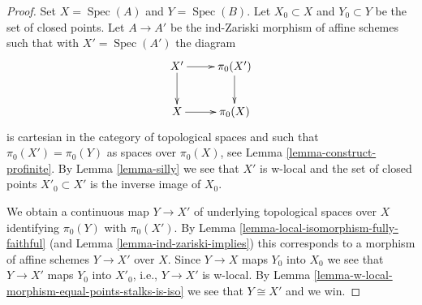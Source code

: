 \documentclass[10pt,a4paper]{amsart}
\theoremstyle{plain}
\theoremstyle{definition}
\theoremstyle{remark}
\numberwithin{equation}{subsection}
\def\Spec{\mathop{\mathrm{Spec}}}
\begin{document}
\begin{proof}
Set $X = \Spec(A)$ and $Y = \Spec(B)$. Let $X_0 \subset X$ and
$Y_0 \subset Y$ be the set of closed points. Let $A \to A'$ be the ind-Zariski
morphism of affine schemes such that with $X' = \Spec(A')$ the diagram
$$
\xymatrix{
X' \ar[r] \ar[d] & \pi_0(X') \ar[d] \\
X \ar[r] & \pi_0(X)
}
$$
is cartesian in the category of topological spaces and such that
$\pi_0(X') = \pi_0(Y)$ as spaces over $\pi_0(X)$, see
Lemma \ref{lemma-construct-profinite}. By
Lemma \ref{lemma-silly} we see that $X'$ is w-local and
the set of closed points $X'_0 \subset X'$ is the inverse image of $X_0$.

\medskip\noindent
We obtain a continuous map $Y \to X'$ of underlying topological spaces
over $X$ identifying $\pi_0(Y)$ with $\pi_0(X')$. By
Lemma \ref{lemma-local-isomorphism-fully-faithful}
(and Lemma \ref{lemma-ind-zariski-implies})
this corresponds to a morphism of affine schemes $Y \to X'$
over $X$. Since $Y \to X$ maps $Y_0$ into $X_0$ we see that
$Y \to X'$ maps $Y_0$ into $X'_0$, i.e., $Y \to X'$ is w-local.
By Lemma \ref{lemma-w-local-morphism-equal-points-stalks-is-iso}
we see that $Y \cong X'$ and we win.
\end{proof}
\end{document}
